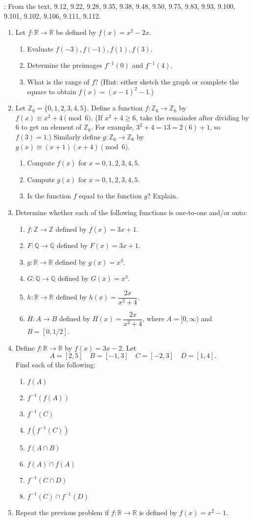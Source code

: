 \documentclass[letterpaper,12pt]{article}
\newcommand{\Z}{\mathbb{Z}}
\newcommand{\R}{\mathbb{R}}
\newcommand{\Q}{\mathbb{Q}}
\begin{document}
: From the text, 9.12, 9.22, 9.28, 9.35, 9.38, 9.48, 9.50, 9.75, 9.83, 9.93, 9.100, 9.101, 9.102, 9.106, 9.111, 9.112.
\begin{enumerate}
 \item Let $f:\R\to\R$ be defined by $f(x) = x^2-2x$.
\begin{enumerate}
 \item Evaluate $f(-3), f(-1), f(1), f(3)$.
 \item Determine the preimages $f^{-1}(0)$ and $f^{-1}(4)$.
 \item What is the range of $f$? (Hint: either sketch the graph or complete the square to obtain $f(x) = (x-1)^2-1$.)
\end{enumerate}
\item Let $\Z_6 = \{0,1,2,3,4,5\}$. Define a function $f:\Z_6\to \Z_6$ by $f(x)\equiv x^2+4 \pmod{6}$. (If $x^2+4\geq 6$, take the remainder after dividing by 6 to get an element of $\Z_6$. For example, $3^2+4 = 13 = 2(6)+1$, so $f(3)=1$.) Similarly define $g:\Z_6\to\Z_6$ by $g(x)\cong (x+1)(x+4)\pmod{6}$.
\begin{enumerate}
 \item Compute $f(x)$ for $x=0,1,2,3,4,5$.
 \item Compute $g(x)$ for $x=0,1,2,3,4,5$.
 \item Is the function $f$ equal to the function $g$? Explain.
\end{enumerate}
\item Determine whether each of the following functions is one-to-one and/or onto:
\begin{enumerate}
 \item $f:\Z\to\Z$ defined by $f(x)=3x+1$.
 \item $F:\Q\to\Q$ defined by $F(x)=3x+1$.
 \item $g:\R\to\R$ defined by $g(x)=x^3$.
 \item $G:\Q\to\Q$ defined by $G(x)=x^3$.
 \item $h:\R\to\R$ defined by $h(x) = \dfrac{2x}{x^2+4}$.
 \item $H:A\to B$ defined by $H(x)=\dfrac{2x}{x^2+4}$, where $A = [0,\infty)$ and $B = [0,1/2]$.
\end{enumerate}
\item Define $f:\R\to\R$ by $f(x) = 3x-2$. Let
\[
 A = [2,5] \quad B =[-1,3] \quad C = [-2,3] \quad D = [1,4].
\]
Find each of the following:
\begin{multicols}{2}
 \begin{enumerate}
  \item $f(A)$
  \item $f^{-1}(f(A))$
  \item $f^{-1}(C)$
  \item $f(f^{-1}(C))$
  \item $f(A\cap B)$
  \item $f(A)\cap f(A)$
  \item $f^{-1}(C\cap D)$
  \item $f^{-1}(C)\cap f^{-1}(D)$
 \end{enumerate}
\end{multicols}
\item Repeat the previous problem if $f:\R\to\R$ is defined by $f(x) = x^2-1$.
\end{enumerate}
\end{document}
